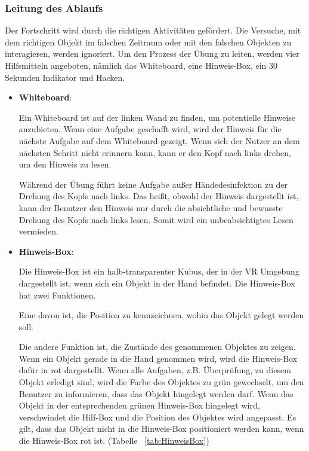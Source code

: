   \subsubsection{Leitung des Ablaufs}
  Der Fortschritt wird durch die richtigen Aktivitäten gefördert. Die Versuche, mit dem richtigen Objekt im falschen Zeitraum oder mit den falschen Objekten zu interagieren, werden ignoriert. Um den Prozess der Übung zu leiten, werden vier Hilfsmitteln angeboten, nämlich das Whiteboard, eine Hinweis-Box, ein 30 Sekunden Indikator und Hacken.
  \begin{itemize}
      \item \textbf{Whiteboard}:
      
      Ein Whiteboard ist auf der linken Wand zu finden, um potentielle Hinweise anzubieten. Wenn eine Aufgabe geschafft wird, wird der Hinweis für die nächste Aufgabe auf dem Whiteboard gezeigt. Wenn sich der Nutzer an dem nächsten Schritt nicht erinnern kann, kann er den Kopf nach links drehen, um den Hinweis zu lesen.
      
      Während der Übung führt keine Aufgabe außer Händedesinfektion zu der Drehung des Kopfs nach links. Das heißt, obwohl der Hinweis dargestellt ist, kann der Benutzer den Hinweis nur durch die absichtliche und bewusste Drehung des Kopfs nach links lesen. Somit wird ein unbeabsichtigtes Lesen vermieden.
      
      \item \textbf{Hinweis-Box}:
      
      Die Hinweis-Box ist ein halb-transparenter Kubus, der in der VR Umgebung dargestellt ist, wenn sich ein Objekt in der Hand befindet.  Die Hinweis-Box hat zwei Funktionen.
      
      Eine davon ist, die Position zu kennzeichnen, wohin das Objekt gelegt werden soll.
      
      Die andere Funktion ist, die Zustände des genommenen Objektes zu zeigen. Wenn ein Objekt gerade in die Hand genommen wird, wird die Hinweis-Box dafür in rot dargestellt. Wenn alle Aufgaben, z.B. Überprüfung, zu diesem Objekt erledigt sind, wird die Farbe des Objektes zu grün gewechselt, um den Benutzer zu informieren, dass das Objekt hingelegt werden darf. Wenn das Objekt in der entsprechenden grünen Hinweis-Box hingelegt wird, verschwindet die Hilf-Box und die Position des Objektes wird angepasst. Es gilt, dass das Objekt nicht in die Hinweis-Box positioniert werden kann, wenn die Hinweis-Box rot ist. (Tabelle ~\ref{tab:HinweisBox})
      

\end{itemize}
